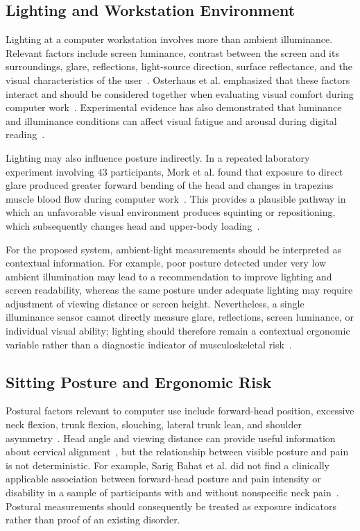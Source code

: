 \subsection{Lighting and Workstation Environment}
Lighting at a computer workstation involves more than ambient illuminance. Relevant factors include screen luminance, contrast between the screen and its surroundings, glare, reflections, light-source direction, surface reflectance, and the visual characteristics of the user~\cite{ref7}. Osterhaus et al. emphasized that these factors interact and should be considered together when evaluating visual comfort during computer work~\cite{ref7}. Experimental evidence has also demonstrated that luminance and illuminance conditions can affect visual fatigue and arousal during digital reading~\cite{ref20}.

Lighting may also influence posture indirectly. In a repeated laboratory experiment involving 43 participants, Mork et al. found that exposure to direct glare produced greater forward bending of the head and changes in trapezius muscle blood flow during computer work~\cite{ref21}. This provides a plausible pathway in which an unfavorable visual environment produces squinting or repositioning, which subsequently changes head and upper-body loading~\cite{ref21}.

For the proposed system, ambient-light measurements should be interpreted as contextual information. For example, poor posture detected under very low ambient illumination may lead to a recommendation to improve lighting and screen readability, whereas the same posture under adequate lighting may require adjustment of viewing distance or screen height. Nevertheless, a single illuminance sensor cannot directly measure glare, reflections, screen luminance, or individual visual ability; lighting should therefore remain a contextual ergonomic variable rather than a diagnostic indicator of musculoskeletal risk~\cite{ref7}.

\subsection{Sitting Posture and Ergonomic Risk}
Postural factors relevant to computer use include forward-head position, excessive neck flexion, trunk flexion, slouching, lateral trunk lean, and shoulder asymmetry~\cite{ref4,ref17,ref19,ref22}. Head angle and viewing distance can provide useful information about cervical alignment~\cite{ref4}, but the relationship between visible posture and pain is not deterministic. For example, Sarig Bahat et al. did not find a clinically applicable association between forward-head posture and pain intensity or disability in a sample of participants with and without nonspecific neck pain~\cite{ref22}. Postural measurements should consequently be treated as exposure indicators rather than proof of an existing disorder.


